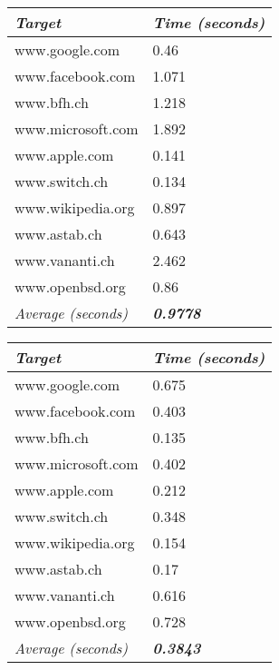 \documentclass[
	a4paper,					10pt,							twoside,					openright,				notitlepage,			parskip=half,			]{scrreprt}
\begin{document}
\\\\\\\\\\
\begin{minipage}[H][5cm][b]{0,5\textwidth}
\centering
\begin{tabular}{l|l}
\textit{\textbf{Target}}   & \textit{\textbf{Time (seconds)}} \\ \hline
www.google.com             & 0.46                             \\
www.facebook.com           & 1.071                            \\
www.bfh.ch                 & 1.218                            \\
www.microsoft.com          & 1.892                            \\
www.apple.com              & 0.141                            \\
www.switch.ch              & 0.134                            \\
www.wikipedia.org          & 0.897                            \\
www.astab.ch               & 0.643                            \\
www.vananti.ch             & 2.462                            \\
www.openbsd.org            & 0.86                             \\ \hline
\textit{Average (seconds)} & \textit{\textbf{0.9778}}        
\end{tabular}
 \label{tab:metadataTraceTable} 
\end{minipage}
\begin{minipage}[H][5cm][b]{0,5\textwidth}
\centering
\begin{tabular}{l|l}
\textit{\textbf{Target}}   & \textit{\textbf{Time (seconds)}} \\ \hline
www.google.com             & 0.675                             \\
www.facebook.com           & 0.403                            \\
www.bfh.ch                 & 0.135                            \\
www.microsoft.com          & 0.402                           \\
www.apple.com              & 0.212                            \\
www.switch.ch              & 0.348                             \\
www.wikipedia.org          & 0.154                            \\
www.astab.ch               & 0.17                            \\
www.vananti.ch             & 0.616                            \\
www.openbsd.org            & 0.728                           \\ \hline
\textit{Average (seconds)} & \textit{\textbf{0.3843}}        
\end{tabular}
 \label{tab:MaliciousActivityTraceTable} 
\end{minipage}
\end{document}

